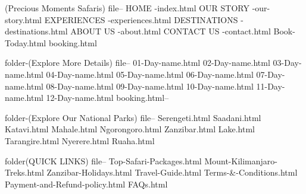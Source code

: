 (Precious Moments Safaris)
     file--  
         HOME         -index.html
         OUR STORY    -our-story.html
         EXPERIENCES  -experiences.html
         DESTINATIONS -destinations.html
         ABOUT US     -about.html
         CONTACT US   -contact.html
                      {Book-Today.html}
                      {booking.html}

folder-(Explore More Details)
     file--
         01-Day-name.html
         02-Day-name.html
         03-Day-name.html
         04-Day-name.html
         05-Day-name.html
         06-Day-name.html
         07-Day-name.html
         08-Day-name.html
         09-Day-name.html
         10-Day-name.html
         11-Day-name.html
         12-Day-name.html
         {booking.html}--

         
folder-(Explore Our National Parks)
     file--
         Serengeti.html
         Saadani.html
         Katavi.html
         Mahale.html
         Ngorongoro.html
         Zanzibar.html
         Lake.html
         Tarangire.html
         Nyerere.html
         Ruaha.html
            
          
folder(QUICK LINKS)
      file--
          Top-Safari-Packages.html
          Mount-Kilimanjaro-Treks.html
          Zanzibar-Holidays.html
          Travel-Guide.html
          Terms-&-Conditions.html
          Payment-and-Refund-policy.html
          FAQs.html

          